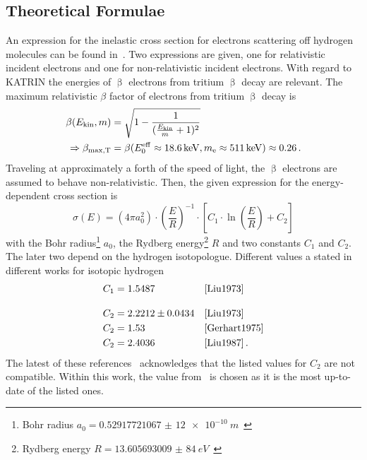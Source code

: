 \subsection{Theoretical Formulae}
\label{sec:eDepScatCrossSecSourcesTheory}
An expression for the inelastic cross section for electrons scattering off hydrogen molecules can be found in~\cite{Liu1973}. Two expressions are given, one for relativistic incident electrons and one for non-relativistic incident electrons. With regard to KATRIN the energies of $\upbeta$ electrons from tritium $\upbeta$ decay are relevant. The maximum relativistic $\beta$ factor of electrons from tritium $\upbeta$ decay is
\begin{align}
\beta(E_\mathrm{kin}, m) &= 
\sqrt{
	1-\frac{1}{
		(\frac{E_\mathrm{kin}}{m}+1)^2
	}
} \label{eq:eDepScatCrossSecSourcesCrossSecBetaFactor} \\
\Rightarrow\beta_\mathrm{max, T} &= 
\beta(E_0^\mathrm{eff}\approx\SI{18.6}{keV}, m_{\mathrm{e}}\approx\SI{511}{keV})\approx0.26 
\text{\,.}
\end{align}
Traveling at approximately a forth of the speed of light, the $\upbeta$ electrons are assumed to behave non-relativistic. Then, the given expression for the energy-dependent cross section is~\cite{Liu1973}
\begin{equation}
\label{eq:eDepScatCrossSecSourcesCrossSecLiu}
\sigma(E) =  
(4 \pi a_0^2) \cdot
\left(\frac{E}{R}\right)^{-1} \cdot
\left[
C_1 \cdot \ln{\left(\frac{E}{R}\right)} + C_2
\right]
\end{equation}
with the Bohr radius\footnote{Bohr radius $a_0=\SI[separate-uncertainty=false]{0.529 177 210 67(12)e-10}{m}$~\cite{ReviewOfParticlePhysics}} $a_0$, 
the Rydberg energy\footnote{Rydberg energy $R=\SI[separate-uncertainty=false]{13.605 693 009(84)}{eV}$~\cite{ReviewOfParticlePhysics}} $R$ and two constants $C_1$ and $C_2$. The later two depend on the hydrogen isotopologue. Different values a stated in different works for isotopic hydrogen
\begin{subequations}
\label{eq:eDepScatCrossSecSourcesCrossSecLiuConstants}
\begin{align}
C_1 &= 1.5487 &&\text{\cite{Liu1973}}
\label{eq:eDepScatCrossSecSourcesCrossSecLiuConstantsC1}\\[10pt]
C_2 &= 2.2212\pm0.0434 &&\text{\cite{Liu1973}}
\label{eq:eDepScatCrossSecSourcesCrossSecLiuConstantsC2Uncert}\\
C_2 &= 1.53 &&\text{\cite{Gerhart1975}} \\
C_2 &= 2.4036 &&\text{\cite{Liu1987}}
\label{eq:eDepScatCrossSecSourcesCrossSecLiuConstantsC2}
\text{\,.}
\end{align}
\end{subequations}
The latest of these references~\cite{Liu1987} acknowledges that the listed values for $C_2$ are not compatible. Within this work, the value from~\cite{Liu1987} is chosen as it is the most up-to-date of the listed ones. 

